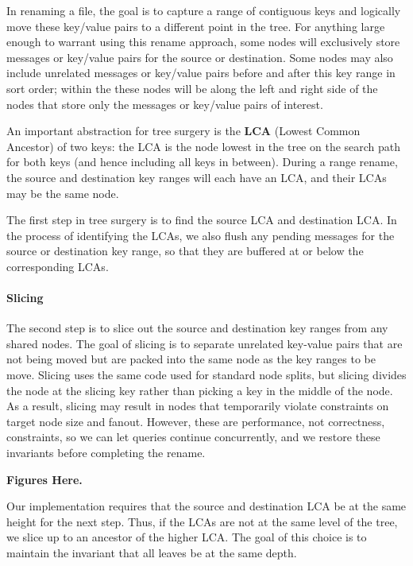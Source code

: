 In renaming a file, the goal is to capture a range of contiguous keys and
logically move these key/value pairs to a different point in the tree.
For anything large enough to warrant using this rename approach,
some \bet nodes will exclusively store messages or key/value pairs
for the source or destination.
Some nodes may also include unrelated messages or key/value pairs
before and after this key range in sort order;
within the \bet these nodes will be along the left and right side of the nodes
that store only the messages or key/value pairs of interest.

An important abstraction for tree surgery is the \textbf{LCA}
(Lowest Common Ancestor) of two keys: the LCA is the \bet node lowest in the
tree on the search path for both keys (and hence including all keys in between).
During a range rename, the source and destination key ranges will each have an
LCA, and their LCAs may be the same node.

The first step in tree surgery is to find the source LCA and destination LCA.
In the process of identifying the LCAs, we also flush any pending messages for
the source or destination key range, so that they are buffered at or below the
corresponding LCAs.

\paragraph{Slicing}  The second step is to slice out the source and destination
key ranges from any shared nodes.
The goal of slicing is to separate unrelated key-value pairs that are not being
moved but are packed into the same \bet node as the key ranges to be move.
Slicing uses the same  code used for standard \bet node splits, but slicing
divides the node at the slicing key rather than picking a key in the middle of
the node.
As a result, slicing may result in nodes that temporarily violate constraints on
target node size and fanout.
However, these are performance, not correctness, constraints, so we can let
queries continue concurrently, and we restore these invariants before completing
the rename.

\textbf{Figures Here.}

Our implementation requires that the source and destination LCA be at the same
height for the next step.
Thus, if the LCAs are not at the same level of the tree, we slice up to an
ancestor of the higher LCA.
The goal of this choice is to maintain the invariant that all \bet leaves be
at the same depth.

